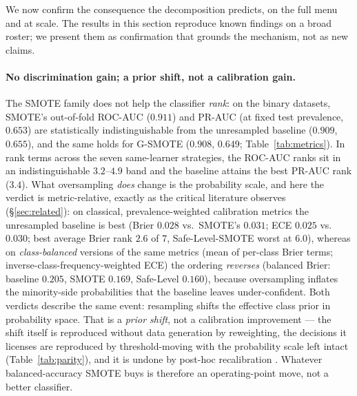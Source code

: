 We now confirm the consequence the decomposition predicts, on the full menu and at
scale. The results in this section reproduce known findings
\cite{provost2000imbalanced,elor2022smote,goorbergh2022harm,dalpozzolo2015calibrating}
on a broad roster; we present them as confirmation that grounds the mechanism, not
as new claims.

\paragraph{No discrimination gain; a prior shift, not a calibration gain.} The
SMOTE family does not
help the classifier \emph{rank}: on the binary datasets, SMOTE's out-of-fold ROC-AUC
($0.911$) and PR-AUC (at fixed test prevalence, $0.653$) are statistically
indistinguishable from the unresampled baseline ($0.909$, $0.655$), and the same
holds for G-SMOTE ($0.908$, $0.649$; Table~\ref{tab:metrics}). In rank terms
across the seven same-learner strategies, the ROC-AUC ranks sit in an
indistinguishable $3.2$--$4.9$ band and the baseline attains the best PR-AUC
rank ($3.4$). What oversampling \emph{does} change is the probability scale, and
here the verdict is metric-relative, exactly as the critical literature
observes (\S\ref{sec:related}): on classical, prevalence-weighted calibration
metrics the unresampled baseline is best (Brier $0.028$ vs.\ SMOTE's $0.031$;
ECE $0.025$ vs.\ $0.030$; best average Brier rank $2.6$ of $7$, Safe-Level-SMOTE
worst at $6.0$), whereas on \emph{class-balanced} versions of the same metrics
(mean of per-class Brier terms; inverse-class-frequency-weighted ECE) the
ordering \emph{reverses} (balanced Brier: baseline $0.205$, SMOTE $0.169$,
Safe-Level $0.160$), because oversampling inflates the minority-side
probabilities that the baseline leaves under-confident. Both verdicts describe
the same event: resampling shifts the effective class prior in probability
space. That is a \emph{prior shift}, not a calibration improvement --- the shift
itself is reproduced without data generation by reweighting, the decisions it
licenses are reproduced by threshold-moving with the probability scale left
intact (Table~\ref{tab:parity}), and it is undone by post-hoc recalibration
\cite{dalpozzolo2015calibrating,goorbergh2022harm,carriero2025harms}. Whatever
balanced-accuracy SMOTE buys is therefore an operating-point move, not a better
classifier.


